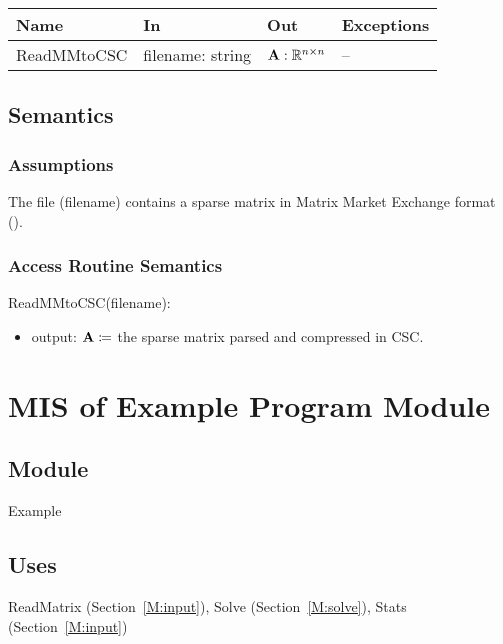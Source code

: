 \documentclass[12pt, titlepage]{article}
\begin{document}
\begin{center}
  \begin{tabular}{p{3cm} p{5cm} p{5cm} p{2cm}}
    \hline
    \textbf{Name}     & \textbf{In}            & \textbf{Out}                  & \textbf{Exceptions} \\
    \hline
    ReadMMtoCSC & filename: string & \(\mathbf{A}: \mathbb{R}^{n \times n}\) & --            \\
    \hline
  \end{tabular}
\end{center}

\subsection{Semantics}

\subsubsection{Assumptions}

The file (filename) contains a sparse matrix in Matrix Market Exchange format
(\cite{noauthor_matrix_2013}).

\subsubsection{Access Routine Semantics}

\noindent ReadMMtoCSC(filename):
\begin{itemize}
\item output: \(\mathbf{A} \coloneq \) the sparse matrix parsed and compressed in CSC.
\end{itemize}

\newpage

\section{MIS of Example Program Module} \label{M:example}

\subsection{Module}

Example

\subsection{Uses}

ReadMatrix (Section~\ref{M:input}), Solve (Section~\ref{M:solve}), Stats (Section~\ref{M:input})
\end{document}
